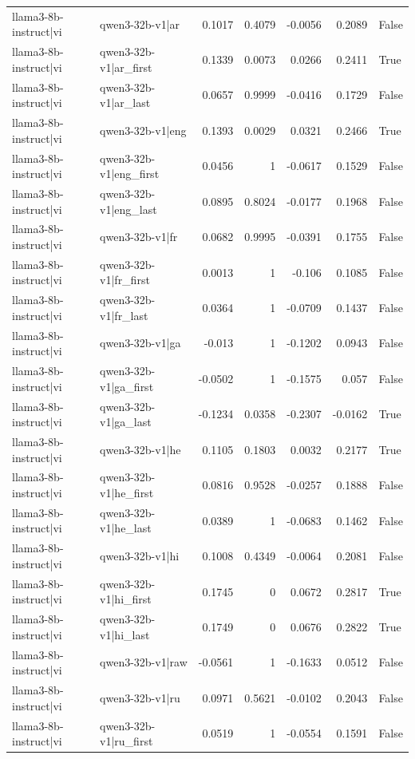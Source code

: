 \begin{table}
\begin{tabular}{l l r r r r l}
llama3-8b-instruct|vi & qwen3-32b-v1|ar & 0.1017 & 0.4079 & -0.0056 & 0.2089 & False \\
llama3-8b-instruct|vi & qwen3-32b-v1|ar_first & 0.1339 & 0.0073 & 0.0266 & 0.2411 & True \\
llama3-8b-instruct|vi & qwen3-32b-v1|ar_last & 0.0657 & 0.9999 & -0.0416 & 0.1729 & False \\
llama3-8b-instruct|vi & qwen3-32b-v1|eng & 0.1393 & 0.0029 & 0.0321 & 0.2466 & True \\
llama3-8b-instruct|vi & qwen3-32b-v1|eng_first & 0.0456 & 1 & -0.0617 & 0.1529 & False \\
llama3-8b-instruct|vi & qwen3-32b-v1|eng_last & 0.0895 & 0.8024 & -0.0177 & 0.1968 & False \\
llama3-8b-instruct|vi & qwen3-32b-v1|fr & 0.0682 & 0.9995 & -0.0391 & 0.1755 & False \\
llama3-8b-instruct|vi & qwen3-32b-v1|fr_first & 0.0013 & 1 & -0.106 & 0.1085 & False \\
llama3-8b-instruct|vi & qwen3-32b-v1|fr_last & 0.0364 & 1 & -0.0709 & 0.1437 & False \\
llama3-8b-instruct|vi & qwen3-32b-v1|ga & -0.013 & 1 & -0.1202 & 0.0943 & False \\
llama3-8b-instruct|vi & qwen3-32b-v1|ga_first & -0.0502 & 1 & -0.1575 & 0.057 & False \\
llama3-8b-instruct|vi & qwen3-32b-v1|ga_last & -0.1234 & 0.0358 & -0.2307 & -0.0162 & True \\
llama3-8b-instruct|vi & qwen3-32b-v1|he & 0.1105 & 0.1803 & 0.0032 & 0.2177 & True \\
llama3-8b-instruct|vi & qwen3-32b-v1|he_first & 0.0816 & 0.9528 & -0.0257 & 0.1888 & False \\
llama3-8b-instruct|vi & qwen3-32b-v1|he_last & 0.0389 & 1 & -0.0683 & 0.1462 & False \\
llama3-8b-instruct|vi & qwen3-32b-v1|hi & 0.1008 & 0.4349 & -0.0064 & 0.2081 & False \\
llama3-8b-instruct|vi & qwen3-32b-v1|hi_first & 0.1745 & 0 & 0.0672 & 0.2817 & True \\
llama3-8b-instruct|vi & qwen3-32b-v1|hi_last & 0.1749 & 0 & 0.0676 & 0.2822 & True \\
llama3-8b-instruct|vi & qwen3-32b-v1|raw & -0.0561 & 1 & -0.1633 & 0.0512 & False \\
llama3-8b-instruct|vi & qwen3-32b-v1|ru & 0.0971 & 0.5621 & -0.0102 & 0.2043 & False \\
llama3-8b-instruct|vi & qwen3-32b-v1|ru_first & 0.0519 & 1 & -0.0554 & 0.1591 & False \\

\end{tabular}
\end{table}
